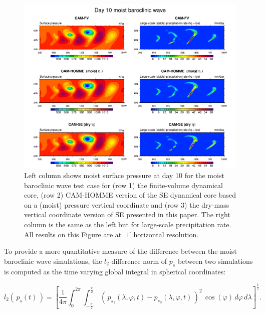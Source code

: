 \documentclass{agujournal}
\begin{document}
{\begin{figure}[h]
\centering
\includegraphics[width=33pc]{figs/02_baro_wave.pdf}
\caption{Left column shows moist surface pressure at day 10 for the moist baroclinic wave test case for (row 1) the finite-volume dynamical core, (row 2) CAM-HOMME version of the SE dynamical core based on a (moist) pressure vertical coordinate and (row 3) the dry-mass vertical coordinate version of SE presented in this paper. The right column is the same as the left but for large-scale precipitation rate. All results on this Figure are at $~1^\circ$ horizontal resolution.}
\label{fig:baro_wave}
\end{figure}

To provide a more quantitative measure of the difference between the moist baroclinic wave simulations, the $l_2$ difference norm of $p_s$ between two simulations is computed as the time varying global integral in spherical coordinates:

\begin{equation}
l_2\left(\,p_s(t)\,\right) = \left[ \frac{1}{4\pi}\int^{2\pi}_{0} \int^{\frac{\pi}{2}}_{-\frac{\pi}{2}} \ \left(\,p_{s_1}(\lambda,\varphi,t) - p_{s_0}(\lambda,\varphi,t)\,\right)^2 \, \cos(\varphi) \, d\varphi \, d\lambda \right]^\frac{1}{2}.
\end{equation}

}
\end{document}
